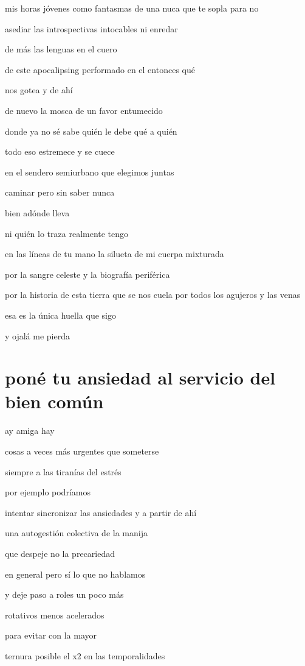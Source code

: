 \documentclass[
]{book}
\begin{document}
mis horas jóvenes como fantasmas de una nuca que te sopla para no

asediar las introspectivas intocables ni enredar

de más las lenguas en el cuero

de este apocalipsing performado en el entonces qué

nos gotea y de ahí

de nuevo la mosca de un favor entumecido

donde ya no sé sabe quién le debe qué a quién

todo eso estremece y se cuece

en el sendero semiurbano que elegimos juntas

caminar pero sin saber nunca

bien adónde lleva

ni quién lo traza realmente tengo

en las líneas de tu mano la silueta de mi cuerpa mixturada

por la sangre celeste y la biografía periférica

por la historia de esta tierra que se nos cuela por todos los agujeros y las venas

esa es la única huella que sigo

y ojalá me pierda

\hypertarget{ponuxe9-tu-ansiedad-al-servicio-del-bien-comuxfan}{%
\chapter{poné tu ansiedad al servicio del bien común}\label{ponuxe9-tu-ansiedad-al-servicio-del-bien-comuxfan}}

ay amiga hay

cosas a veces más urgentes que someterse

siempre a las tiranías del estrés

por ejemplo podríamos

intentar sincronizar las ansiedades y a partir de ahí

una autogestión colectiva de la manija

que despeje no la precariedad

en general pero sí lo que no hablamos

y deje paso a roles un poco más

rotativos menos acelerados

para evitar con la mayor

ternura posible el x2 en las temporalidades
\end{document}
